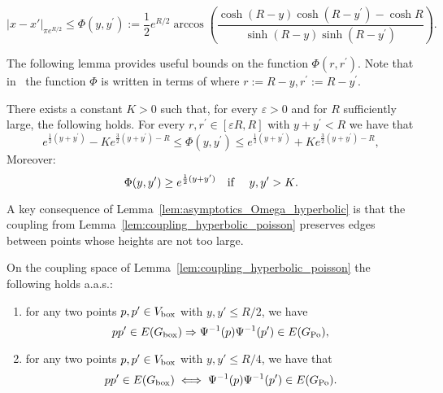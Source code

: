 \begin{equation}\label{eq:def_Omega_hyperbolic}
	|x-x'|_{\pi e^{R/2}} \leq \Phi(y,y^\prime) := \frac{1}{2}e^{R/2} \arccos\left( \frac{\cosh(R-y) \cosh(R-y^\prime) - \cosh R}{\sinh(R-y) \sinh(R-y^\prime)} \right).
\end{equation}

The following lemma provides useful bounds on the function $\Phi(r,r^\prime)$. Note that in~\cite{fountoulakis2018law} the function $\Phi$ is written in terms of where $r := R - y, r^\prime := R - y^\prime$. 

\begin{lemma}\label{lem:asymptotics_Omega_hyperbolic}
There exists a constant $K>0$ such that, for every $\varepsilon > 0$ and for $R$ sufficiently large, the following holds.
For every $r,r^\prime \in [\varepsilon R,R]$ with $y + y^\prime < R$ we have that 
\begin{equation}\label{eq:asymp1}
	e^{\frac{1}{2}(y+y^\prime)} - K e^{\frac{3}{2}(y+y^\prime) - R} \leq \Phi(y, y^\prime) 
	\leq  e^{\frac{1}{2}(y+y^\prime)} + K e^{\frac{3}{2}(y+y^\prime) - R},
\end{equation}
Moreover:
\begin{equation}\label{eq:asymp2} 
\Phi(y,y^\prime) \geq e^{\frac12(y+y^\prime)} \quad \text{if \quad $y, y^\prime > K$.} 
\end{equation}
\end{lemma}

A key consequence of Lemma~\ref{lem:asymptotics_Omega_hyperbolic} is that the coupling from Lemma~\ref{lem:coupling_hyperbolic_poisson} preserves edges between points whose heights are not too large.  

\begin{lemma}\label{lem:coupling_edges}
On the coupling space of Lemma~\ref{lem:coupling_hyperbolic_poisson} the following holds a.a.s.:
\begin{enumerate}
\item for any two points $p, p' \in V_{\text{box}}$ with $y, y'\le R/2$, we have 
\[
	pp' \in E(G_{\mathrm{box}}) \Rightarrow \Psi^{-1}(p)\Psi^{-1}(p') \in E(G_{{\mathrm{Po}}}),
\]
\item for any two points $p, p' \in V_{\text{box}}$ with $y, y' \le R/4$, we have that 
\[
	pp' \in E(G_{\mathrm{box}}) \iff \Psi^{-1}(p)\Psi^{-1}(p') \in E(G_{{\mathrm{Po}}}).
\]

\end{enumerate}
\end{lemma}

